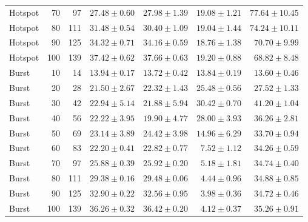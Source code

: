 \begin{table}[htbp]
\begin{tabular*}{\linewidth}{@{\extracolsep{\fill}}lrrrrrr}
Hotspot & 70 & 97 & $27.48 \pm 0.60$ & $27.98 \pm 1.39$ & $19.08 \pm 1.21$ & $77.64 \pm 10.45$\\
Hotspot & 80 & 111 & $31.48 \pm 0.54$ & $30.40 \pm 1.09$ & $19.04 \pm 1.44$ & $74.24 \pm 10.11$\\
Hotspot & 90 & 125 & $34.32 \pm 0.71$ & $34.16 \pm 0.59$ & $18.76 \pm 1.38$ & $70.70 \pm 9.99$\\
Hotspot & 100 & 139 & $37.42 \pm 0.62$ & $37.66 \pm 0.63$ & $19.20 \pm 0.88$ & $68.82 \pm 8.48$\\
\midrule
Burst & 10 & 14 & $13.94 \pm 0.17$ & $13.72 \pm 0.42$ & $13.84 \pm 0.19$ & $13.60 \pm 0.46$\\
Burst & 20 & 28 & $21.50 \pm 2.67$ & $22.32 \pm 1.43$ & $25.48 \pm 0.56$ & $27.52 \pm 1.33$\\
Burst & 30 & 42 & $22.94 \pm 5.14$ & $21.88 \pm 5.94$ & $30.42 \pm 0.70$ & $41.20 \pm 1.04$\\
Burst & 40 & 56 & $22.22 \pm 3.95$ & $19.90 \pm 4.77$ & $28.00 \pm 3.93$ & $36.26 \pm 2.81$\\
Burst & 50 & 69 & $23.14 \pm 3.89$ & $24.42 \pm 3.98$ & $14.96 \pm 6.29$ & $33.70 \pm 0.94$\\
Burst & 60 & 83 & $22.20 \pm 0.41$ & $22.82 \pm 0.77$ & $7.52 \pm 1.12$ & $34.26 \pm 0.59$\\
Burst & 70 & 97 & $25.88 \pm 0.39$ & $25.92 \pm 0.20$ & $5.18 \pm 1.81$ & $34.74 \pm 0.40$\\
Burst & 80 & 111 & $29.38 \pm 0.16$ & $29.48 \pm 0.06$ & $4.44 \pm 0.96$ & $34.88 \pm 0.85$\\
Burst & 90 & 125 & $32.90 \pm 0.22$ & $32.56 \pm 0.95$ & $3.98 \pm 0.36$ & $34.72 \pm 0.46$\\
Burst & 100 & 139 & $36.26 \pm 0.32$ & $36.42 \pm 0.20$ & $4.12 \pm 0.37$ & $35.26 \pm 0.91$\\
\bottomrule\end{tabular*}\end{table}
\clearpage
